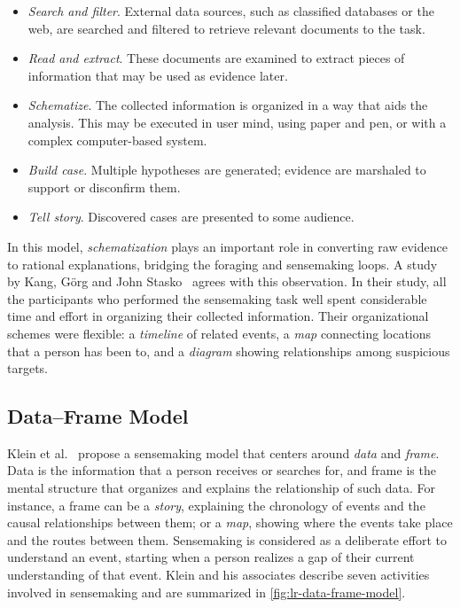 \begin{itemize}
	\item \emph{Search and filter}. External data sources, such as classified databases or the web, are searched and filtered to retrieve relevant documents to the task.
	\item \emph{Read and extract}. These documents are examined to extract pieces of information that may be used as evidence later.
	\item \emph{Schematize}.  The collected information is organized in a way that aids the analysis. This may be executed in user mind, using paper and pen, or with a complex computer-based system.
	\item \emph{Build case}. Multiple hypotheses are generated; evidence are marshaled to support or disconfirm them.
	\item \emph{Tell story}. Discovered cases are presented to some audience.
\end{itemize}

In this model, \emph{schematization} plays an important role in converting raw evidence to rational explanations, bridging the foraging and sensemaking loops. A study by Kang, Görg and John Stasko~\cite{Kang2011} agrees with this observation. In their study, all the participants who performed the sensemaking task well spent considerable time and effort in organizing their collected information. Their organizational schemes were flexible: a \emph{timeline} of related events, a \emph{map} connecting locations that a person has been to, and a \emph{diagram} showing relationships among suspicious targets.

\subsection{Data--Frame Model}
\label{sub:rv-dfm}
Klein et al.~\cite{Klein2003} propose a sensemaking model that centers around \emph{data} and \emph{frame}. Data is the information that a person receives or searches for, and frame is the mental structure that organizes and explains the relationship of such data. For instance, a frame can be a \emph{story}, explaining the chronology of events and the causal relationships between
them; or a \emph{map}, showing where the events take place and the routes between them. Sensemaking is considered as a deliberate effort to understand an event, starting when a person realizes a gap of their current understanding of that event. Klein and his associates describe seven activities involved in sensemaking and are summarized in \autoref{fig:lr-data-frame-model}.

